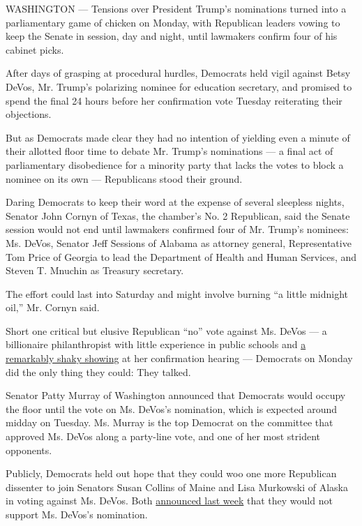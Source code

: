 WASHINGTON --- Tensions over President Trump's nominations turned into a
parliamentary game of chicken on Monday, with Republican leaders vowing
to keep the Senate in session, day and night, until lawmakers confirm
four of his cabinet picks.

After days of grasping at procedural hurdles, Democrats held vigil
against Betsy DeVos, Mr. Trump's polarizing nominee for education
secretary, and promised to spend the final 24 hours before her
confirmation vote Tuesday reiterating their objections.

But as Democrats made clear they had no intention of yielding even a
minute of their allotted floor time to debate Mr. Trump's nominations
--- a final act of parliamentary disobedience for a minority party that
lacks the votes to block a nominee on its own --- Republicans stood
their ground.

Daring Democrats to keep their word at the expense of several sleepless
nights, Senator John Cornyn of Texas, the chamber's No. 2 Republican,
said the Senate session would not end until lawmakers confirmed four of
Mr. Trump's nominees: Ms. DeVos, Senator Jeff Sessions of Alabama as
attorney general, Representative Tom Price of Georgia to lead the
Department of Health and Human Services, and Steven T. Mnuchin as
Treasury secretary.

The effort could last into Saturday and might involve burning ``a little
midnight oil,'' Mr. Cornyn said.

Short one critical but elusive Republican ``no'' vote against Ms. DeVos
--- a billionaire philanthropist with little experience in public
schools and
\href{https://www.nytimes.com/2017/01/18/us/politics/betsy-devos-education-secretary-confirmation-donald-trump.html}{a
remarkably shaky showing} at her confirmation hearing --- Democrats on
Monday did the only thing they could: They talked.

Senator Patty Murray of Washington announced that Democrats would occupy
the floor until the vote on Ms. DeVos's nomination, which is expected
around midday on Tuesday. Ms. Murray is the top Democrat on the
committee that approved Ms. DeVos along a party-line vote, and one of
her most strident opponents.

Publicly, Democrats held out hope that they could woo one more
Republican dissenter to join Senators Susan Collins of Maine and Lisa
Murkowski of Alaska in voting against Ms. DeVos. Both
\href{https://www.nytimes.com/2017/02/01/us/politics/trump-cabinet-nominations-senate.html}{announced
last week} that they would not support Ms. DeVos's nomination.

